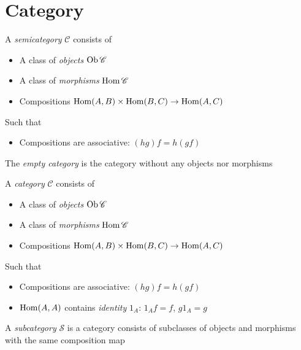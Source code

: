\documentclass[main]{subfiles}
\begin{document}
\tableofcontents
\newpage

\section{Category}

\begin{definition}
A \textit{semicategory} $\mathscr C$ consists of
\begin{itemize}
\item A class of \textit{objects} $\operatorname{Ob}\mathscr C$
\item A class of \textit{morphisms} $\operatorname{Hom}\mathscr C$
\item Compositions $\operatorname{Hom}(A,B)\times\operatorname{Hom}(B,C)\to\operatorname{Hom}(A,C)$
\end{itemize}
Such that
\begin{itemize}
\item Compositions are associative: $(hg)f=h(gf)$
\end{itemize}
\end{definition}

\begin{definition}
The \textit{empty category} is the category without any objects nor morphisms
\end{definition}

\begin{definition}
A \textit{category} $\mathscr{C}$ consists of
\begin{itemize}
\item A class of \textit{objects} $\operatorname{Ob}\mathscr C$
\item A class of \textit{morphisms} $\operatorname{Hom}\mathscr C$
\item Compositions $\operatorname{Hom}(A,B)\times\operatorname{Hom}(B,C)\to\operatorname{Hom}(A,C)$
\end{itemize}
Such that
\begin{itemize}
\item Compositions are associative: $(hg)f=h(gf)$
\item $\operatorname{Hom}(A,A)$ contains \textit{identity} $1_A$: $1_Af=f$, $g1_A=g$
\end{itemize}
\end{definition}

\begin{definition}
A \textit{subcategory} $\mathscr S$ is a category consists of subclasses of objects and morphisms with the same composition map
\end{definition}
\end{document}
